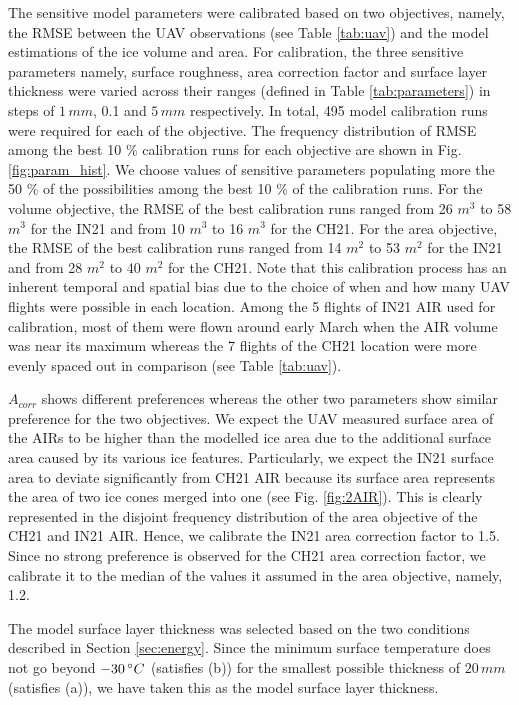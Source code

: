 \documentclass[utf8]{frontiersSCNS}
\begin{document}
The sensitive model parameters were calibrated based on two objectives, namely, the RMSE between the UAV
observations (see Table \ref{tab:uav}) and the model estimations of the ice volume and area. For calibration, the three sensitive
parameters namely, surface roughness, area correction factor and surface layer thickness were varied across
their ranges (defined in Table \ref{tab:parameters}) in steps of $1 \, mm$, 0.1 and $5 \, mm$ respectively. In
total, 495 model calibration runs were required for each of the objective. The frequency distribution of RMSE
among the best 10 \% calibration runs for each objective are shown in Fig.  \ref{fig:param_hist}. We choose values of
sensitive parameters populating more the 50 \% of the possibilities among the best 10 \% of the calibration
runs. For the volume objective, the RMSE of the best calibration runs ranged from 26 $m^3$ to 58 $m^3$ for the
IN21 and from 10 $m^3$ to 16 $m^3$ for the CH21. For the area objective, the RMSE of the best calibration runs
ranged from 14 $m^2$ to 53 $m^2$ for the IN21 and from 28 $m^2$ to 40 $m^2$ for the CH21. Note that this
calibration process has an inherent temporal and spatial bias due to the choice of when and how many UAV flights
were possible in each location. Among the 5 flights of IN21 AIR used for calibration, most of them were flown
around early March when the AIR volume was near its maximum whereas the 7 flights of the CH21 location were more
evenly spaced out in comparison (see Table \ref{tab:uav}).

$A_{corr}$ shows different preferences whereas the other two parameters show similar preference for the two
objectives. We expect the UAV measured surface area of the AIRs to be higher than the modelled ice area due to the
additional surface area caused by its various ice features. Particularly, we expect the IN21 surface area to
deviate significantly from CH21 AIR because its surface area represents the area of two ice cones merged into one
(see Fig.  \ref{fig:2AIR}). This is clearly represented in the disjoint frequency distribution of the area
objective of the CH21 and IN21 AIR. Hence, we calibrate the IN21 area correction factor to 1.5. Since no strong
preference is observed for the CH21 area correction factor, we calibrate it to the median of the values it assumed
in the area objective, namely, 1.2.

The model surface layer thickness was selected based on the two conditions described in Section \ref{sec:energy}.
Since the minimum surface temperature does not go beyond $-30 \, \degree C$ (satisfies (b)) for the smallest
possible thickness of $20\, mm$ (satisfies (a)), we have taken this as the model surface layer thickness.
\end{document}
